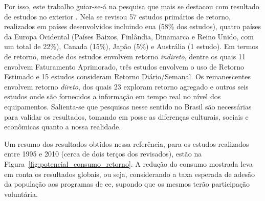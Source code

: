 Por isso, este trabalho guiar-se-á
na pesquisa que mais se destacou com resultado de estudos no exterior
\cite{aceee_2010_estudos_feedback}. Nela se revisou 57 estudos
primários de retorno, realizados em países desenvolvidos incluindo
\gls{eua} (58\% dos estudos), quatro países da Europa Ocidental
(Países Baixos, Finlândia, Dinamarca e Reino Unido, com um total de
22\%), Canada (15\%), Japão (5\%) e Austrália (1 estudo). Em termos de
retorno, metade dos estudos envolvem retorno \emph{indireto}, dentre
os quais 11 envolvem Faturamento Aprimorado, três estudos envolvem o
uso de Retorno Estimado e 15 estudos consideram Retorno
Diário/Semanal. Os remanescentes envolvem retorno \emph{direto}, dos
quais 23 exploram retorno agregado e outros seis estudos onde são
fornecidos a informação em tempo real no nível dos equipamentos.
Salienta-se que pesquisas nesse sentido no Brasil são necessárias para
validar os resultados, tomando em posse as diferenças culturais,
sociais e econômicas quanto a nossa realidade.



Um resumo dos resultados obtidos nessa referência, para os estudos realizados entre 1995 e
2010 (cerca de dois terços dos revisados), estão na Figura~\ref{fig:potencial_consumo_retorno}.
A redução do consumo mostrada leva em conta os
resultados globais, ou seja, considerando a taxa esperada de adesão da população aos
programas de \gls{ee}, supondo que os mesmos terão participação voluntária.

